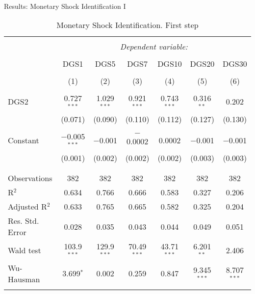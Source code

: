 \documentclass[11pt,pdf,aspectratio=129]{beamer}
\begin{document}
\begin{frame}{Results: Monetary Shock Identification I}
    \begin{table}[ht] \centering \tiny
        \begin{threeparttable}
        \caption{Monetary Shock Identification.  First step} 
        \label{tab:Betas} 
      \begin{tabular}{@{\extracolsep{1pt}}lcccccc} 
        \\[-1.8ex]\hline 
        \hline \\[-1.8ex] 
         & \multicolumn{6}{c}{\textit{Dependent variable:}} \\ 
        \cline{2-7} 
        \\[-1.8ex] & DGS1 & DGS5 & DGS7 & DGS10 & DGS20 & DGS30 \\ 
        \\[-1.8ex] & (1) & (2) & (3) & (4) & (5) & (6)\\ 
        \hline \\[-1.8ex] 
         DGS2 & 0.727$^{***}$ & 1.029$^{***}$ & 0.921$^{***}$ & 0.743$^{***}$ & 0.316$^{**}$ & 0.202 \\ 
          & (0.071) & (0.090) & (0.110) & (0.112) & (0.127) & (0.130) \\ 
          & & & & & & \\ 
         Constant & $-$0.005$^{***}$ & $-$0.001 & $-$0.0002 & 0.0002 & $-$0.001 & $-$0.001 \\ 
          & (0.001) & (0.002) & (0.002) & (0.002) & (0.003) & (0.003) \\ 
          & & & & & & \\ 
        \hline \\[-1.8ex] 
        Observations & 382 & 382 & 382 & 382 & 382 & 382 \\ 
        R$^{2}$ & 0.634 & 0.766 & 0.666 & 0.583 & 0.327 & 0.206 \\ 
        Adjusted R$^{2}$ & 0.633 & 0.765 & 0.665 & 0.582 & 0.325 & 0.204 \\ 
        Res. Std. Error & 0.028 & 0.035 & 0.043 & 0.044 & 0.049 & 0.051 \\ 
        Wald test & 103.9$^{***}$&129.9$^{***}$& 70.49$^{***}$&43.71$^{***}$& 6.201$^{**}$&2.406\\
        Wu-Hausman& 3.699$^{*}$& 0.002&0.259&0.847& 9.345 $^{***}$ & 8.707$^{***}$\\
        \hline 
        \hline \\[-1.8ex] 
      \end{tabular} 
      \begin{tablenotes}[flushleft]

\end{tablenotes}
\end{threeparttable}
\end{table}
\end{frame}
\end{document}
